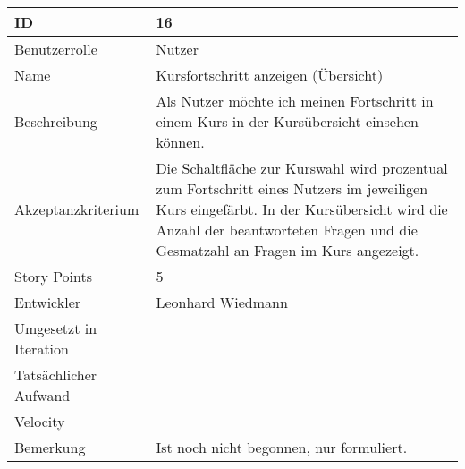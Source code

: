 \begin{tabularx}{\textwidth}{|p{}|X|}
	\hline
	ID & 16\\
	\hline
	Benutzerrolle & Nutzer\\
	\hline
	Name & Kursfortschritt anzeigen (Übersicht)\\
	\hline
	Beschreibung & Als Nutzer möchte ich meinen Fortschritt in einem Kurs in der Kursübersicht einsehen können.\\
	\hline
	Akzeptanzkriterium & Die Schaltfläche zur Kurswahl wird prozentual zum Fortschritt eines Nutzers im jeweiligen Kurs eingefärbt. In der Kursübersicht wird die Anzahl der beantworteten Fragen und die Gesmatzahl an Fragen im Kurs angezeigt.\\
	\hline
	Story Points & 5\\
	\hline
	Entwickler & Leonhard Wiedmann\\
	\hline
	Umgesetzt in Iteration & \\
	\hline
	Tatsächlicher Aufwand & \\
	\hline
	Velocity & \\
	\hline
	Bemerkung & Ist noch nicht begonnen, nur formuliert.\\
	\hline
\end{tabularx}
\vspace{20pt}
